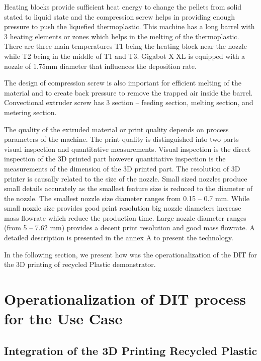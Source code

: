 \documentclass[
  11pt,
]{article}
\begin{document}
Heating blocks provide sufficient heat energy to change the pellets from
solid stated to liquid state and the compression screw helps in
providing enough pressure to push the liquefied thermoplastic. This
machine has a long barrel with 3 heating elements or zones which helps
in the melting of the thermoplastic. There are three main temperatures
T1 being the heating block near the nozzle while T2 being in the middle
of T1 and T3. Gigabot X XL is equipped with a nozzle of 1.75mm diameter
that influences the deposition rate.

The design of compression screw is also important for efficient melting
of the material and to create back pressure to remove the trapped air
inside the barrel. Convectional extruder screw has 3 section -- feeding
section, melting section, and metering section.

The quality of the extruded material or print quality depends on process
parameters of the machine. The print quality is distinguished into two
parts visual inspection and quantitative measurements. Visual inspection
is the direct inspection of the 3D printed part however quantitative
inspection is the measurements of the dimension of the 3D printed part.
The resolution of 3D printer is causally related to the size of the
nozzle. Small sized nozzles produce small details accurately as the
smallest feature size is reduced to the diameter of the nozzle. The
smallest nozzle size diameter ranges from 0.15 -- 0.7 mm. While small
nozzle size provides good print resolution big nozzle diameters increase
mass flowrate which reduce the production time. Large nozzle diameter
ranges (from 5 -- 7.62 mm) provides a decent print resolution and good
mass flowrate. A detailed description is presented in the annex A to
present the technology.

In the following section, we present how was the operationalization of
the DIT for the 3D printing of recycled Plastic demonstrator.

\newpage

\hypertarget{sec-dit}{%
\section{Operationalization of DIT process for the Use
Case}\label{sec-dit}}

\hypertarget{integration-of-the-3d-printing-recycled-plastic}{%
\subsection{Integration of the 3D Printing Recycled
Plastic}\label{integration-of-the-3d-printing-recycled-plastic}}
\end{document}
